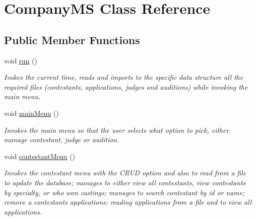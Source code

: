 \hypertarget{class_company_m_s}{}\section{Company\+MS Class Reference}
\label{class_company_m_s}
\subsection*{Public Member Functions}
\begin{DoxyCompactItemize}
\item 
\mbox{\label{class_company_m_s_ac6978587e70f3685784541f2c27058f3}} 
void \hyperlink{class_company_m_s_ac6978587e70f3685784541f2c27058f3}{run} ()
\begin{DoxyCompactList}\small\item\em Ivokes the current time, reads and imports to the specific data structure all the required files (contestants, applications, judges and auditions) while invoking the main menu. \end{DoxyCompactList}\item 
\mbox{\label{class_company_m_s_a7288a77ae53701d3184cba99850edb45}} 
void \hyperlink{class_company_m_s_a7288a77ae53701d3184cba99850edb45}{main\+Menu} ()
\begin{DoxyCompactList}\small\item\em Invokes the main menu so that the user selects what option to pick, either manage contestant, judge or audition. \end{DoxyCompactList}\item 
\mbox{\label{class_company_m_s_a34d80c6a9724b088bbbeea878d96cf16}} 
void \hyperlink{class_company_m_s_a34d80c6a9724b088bbbeea878d96cf16}{contestant\+Menu} ()
\begin{DoxyCompactList}\small\item\em Invokes the contestant menu with the C\+R\+UD option and also to read from a file to update the database; manages to either view all contestants, view contestants by specialty, or who won castings; manages to search contestant by id or name; remove a contestant\textquotesingle{}s applications; reading applications from a file and to view all applications. \end{DoxyCompactList}\item 
\mbox{\label{class_company_m_s_ab0f02c294f82400a7874d960908dd01f}} 

\end{DoxyCompactItemize}
